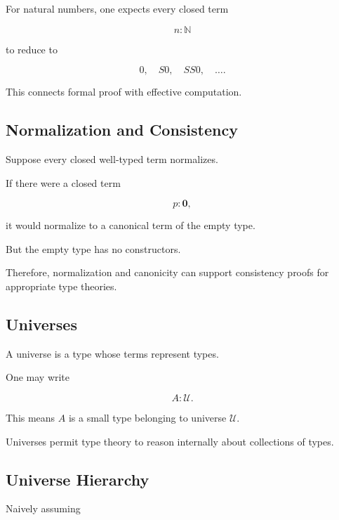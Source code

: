 For natural numbers, one expects every closed term

\[
n:\mathbb{N}
\]

to reduce to

\[
\boxed{
0,
\quad
S0,
\quad
SS0,
\quad
\ldots.
}
\]

This connects formal proof with effective computation.

\subsection{Normalization and Consistency}
\label{subsec:type-theory-normalization-consistency}

Suppose every closed well-typed term normalizes.

If there were a closed term

\[
p:\mathbf{0},
\]

it would normalize to a canonical term of the empty type.

But the empty type has no constructors.

Therefore, normalization and canonicity can support consistency proofs for
appropriate type theories.

\subsection{Universes}
\label{subsec:type-theory-universes}

A universe is a type whose terms represent types.

One may write

\[
\boxed{
A:\mathcal{U}.
}
\]

This means \(A\) is a small type belonging to universe \(\mathcal{U}\).

Universes permit type theory to reason internally about collections of
types.

\subsection{Universe Hierarchy}
\label{subsec:universe-hierarchy}

Naively assuming

